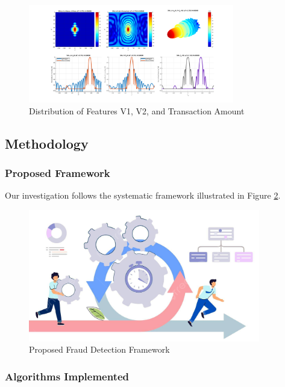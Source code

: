 \begin{figure}[h!]
\centering
\includegraphics[width=0.8\textwidth]{images/feature_distribution.png}
\caption{Distribution of Features V1, V2, and Transaction Amount}
\label{fig:feature_dist}
\end{figure}

\subsection{Methodology}

\subsubsection{Proposed Framework}

Our investigation follows the systematic framework illustrated in Figure \ref{fig:framework}.

\begin{figure}[h!]
\centering
\includegraphics[width=0.9\textwidth]{images/methodology_framework.png}
\caption{Proposed Fraud Detection Framework}
\label{fig:framework}
\end{figure}

\subsubsection{Algorithms Implemented}

